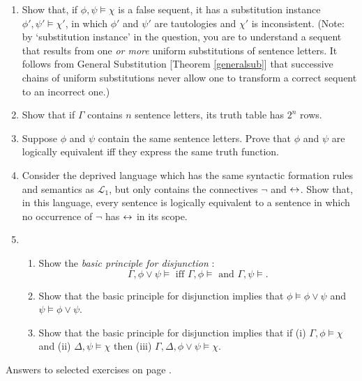 {\begin{enumerate}
\item Show that, if $\phi,\psi \vDash \chi$ is a false sequent,
it has a substitution instance $\phi',\psi' \vDash \chi'$, in which 
$\phi'$ and $\psi'$ are tautologies and $\chi'$ is
inconsistent. (Note: by `substitution instance' in the question, you are to understand a sequent that results from one \emph{or more} uniform substitutions of sentence letters. It follows from General Substitution [Theorem \ref{generalsub}] that successive chains of uniform substitutions never allow one to transform a correct sequent to an incorrect one.)

\item  Show that if $\Gamma$ contains $n$ sentence letters, its truth table has $2^{n}$ rows.

\item Suppose $\phi$ and $\psi$ contain the same sentence letters. Prove that $\phi$ and $\psi$ are logically equivalent iff they express the same truth function.

\item Consider the deprived language which has the same syntactic formation rules and semantics as $\mathcal{L}_{1}$, but only contains the connectives $\neg$ and $\leftrightarrow$. Show that, in this language, every sentence is logically equivalent to a sentence in which no occurrence of $\neg$ has $\leftrightarrow$ in its scope.



\item \begin{enumerate}
	\item Show the \emph{basic principle for disjunction} \citep[§2.5]{bosintlo}: $$\Gamma, \phi\vee\psi \vDash  \text{ iff } \Gamma,\phi \vDash \text{ and } \Gamma,\psi \vDash.$$
	\item Show that the basic principle for disjunction implies that $\phi \vDash \phi \vee \psi$ and $\psi \vDash \phi \vee \psi$.
	\item Show that the basic principle for disjunction implies that  if (i) $\Gamma, \phi \vDash  \chi$ and (ii) $\Delta, \psi \vDash \chi$ then (iii) $\Gamma,\Delta, \phi \vee \psi \vDash \chi$.
\end{enumerate}
\end{enumerate}

Answers to selected exercises on page \pageref{ans4}.
}